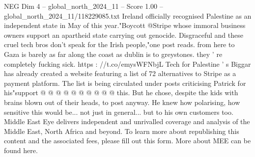 \begin{textsample}{NEG Dim 4 – global\_north\_2024\_11 – Score 1.00 – global\_north\_2024\_11/118229085.txt}
Ireland officially recognised Palestine as an independent state in May of this year."Boycott @Stripe whose immoral business owners support an apartheid state carrying out genocide.
Disgraceful and these cruel tech bros don't speak for the Irish people,"one post reads. from here to Gaza is barely as far along the coast as dublin is to greystones. they ' re completely fucking sick. https : //t.co/emysWFNbjL Tech for Palestine ' s Biggar has already created a website featuring a list of 72 alternatives to Stripe as a payment platform.
The list is being circulated under posts criticising Patrick for his"support @ @ @ @ @ @ @ @ @ @ this.
But he chose, despite the kids with brains blown out of their heads, to post anyway.
He knew how polarising, how sensitive this would be... not just in general... but to his own customers too.
Middle East Eye delivers independent and unrivalled coverage and analysis of the Middle East, North Africa and beyond.
To learn more about republishing this content and the associated fees, please fill out this form.
More about MEE can be found here.

\end{textsample}
